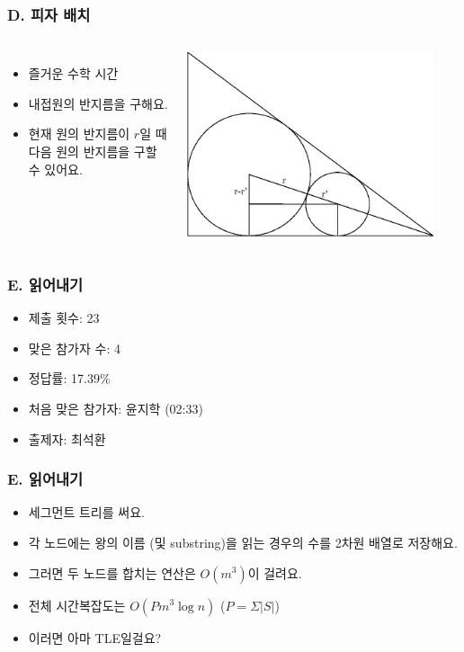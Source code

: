 \documentclass[xetex]{beamer}
\begin{document}
\begin{frame}
  \frametitle{D. 피자 배치}
  \begin{columns}
      \begin{itemize}
        \item 즐거운 수학 시간
        \item 내접원의 반지름을 구해요.
        \item 현재 원의 반지름이 $r$일 때 다음 원의 반지름을 구할 수 있어요.
      \end{itemize}
      \includegraphics[width=0.9\textwidth]{pizza-solution.eps}
  \end{columns}
\end{frame}

\begin{frame}
  \frametitle{E. 읽어내기}
  \begin{itemize}
    \item 제출 횟수: 23
    \item 맞은 참가자 수: 4
    \item 정답률: 17.39\%
    \item 처음 맞은 참가자: 윤지학 (02:33)
    \item 출제자: 최석환
  \end{itemize}
\end{frame}

\begin{frame}
  \frametitle{E. 읽어내기}
  \begin{itemize}
    \item 세그먼트 트리를 써요.
    \item 각 노드에는 왕의 이름 (및 substring)을 읽는 경우의 수를 2차원 배열로 저장해요.
    \item 그러면 두 노드를 합치는 연산은 $O(m^{3})$이 걸려요.
    \item 전체 시간복잡도는 $O(Pm^{3}\log n)$ ($P = \Sigma|S|$)
    \item 이러면 아마 TLE일걸요?
  \end{itemize}
\end{frame}
\end{document}
